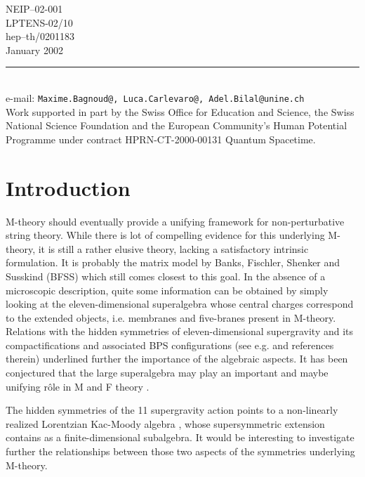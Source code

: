 \documentclass[a4paper,11pt]{article}
\begin{document}
\vspace{-170mm}
\begin{flushright}
NEIP--02-001 \\
LPTENS-02/10 \\
hep--th/0201183 \\
January 2002
\end{flushright}
\vspace{2.4cm}
\vfill
\begin{flushleft}
\rule{8.1cm}{0.2mm}\\

{\small e-mail: \tt Maxime.Bagnoud@, Luca.Carlevaro@, Adel.Bilal@unine.ch}\\
{\small Work supported in part by the Swiss Office for Education and Science,
the Swiss National Science Foundation and the European Community's Human 
Potential Programme under contract HPRN-CT-2000-00131 Quantum Spacetime.}\\
\end{flushleft}

\newpage
{}  
\section{Introduction}
M-theory \cite{Witten} should eventually provide a unifying framework for non-perturbative string theory. 
While there is lot of compelling evidence for this underlying M-theory, it is still a rather elusive theory, 
lacking a satisfactory intrinsic formulation. It is probably the matrix model by Banks, Fischler, Shenker and 
Susskind (BFSS) \cite{BFSS} which still comes closest to this goal.
In the absence of a microscopic description, quite some information can be obtained by simply looking at 
the eleven-dimensional superalgebra \cite{Townsend} whose central charges correspond to the extended objects,
i.e. membranes and five-branes present in M-theory. Relations with the hidden symmetries of eleven-dimensional 
supergravity \cite{CJS} and its compactifications and associated BPS configurations (see e.g. \cite{deWit,West}
and references therein) underlined further the importance of the algebraic aspects. It has been conjectured \cite{BVP} 
that the large superalgebra \coordHE{} may play an important and maybe 
unifying r\^ole in M and F theory \cite{Vafa}.

The hidden symmetries of the 11\coordHE{} supergravity action points to a non-linearly realized Lorentzian Kac-Moody algebra
\coordHE{}, whose supersymmetric extension contains \coordHE{} as a finite-dimensional subalgebra. 
It would be interesting to investigate further the relationships between those two aspects of the symmetries underlying 
M-theory. 
\end{document}
